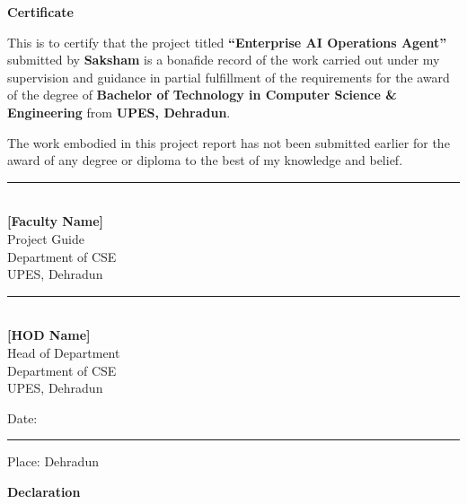 \documentclass[12pt, a4paper]{report}
\begin{document}
\newpage
\thispagestyle{empty}
\begin{center}
{\LARGE \textbf{Certificate}}
\end{center}

\vspace{1cm}

This is to certify that the project titled \textbf{``Enterprise AI Operations Agent''} submitted by \textbf{Saksham} is a bonafide record of the work carried out under my supervision and guidance in partial fulfillment of the requirements for the award of the degree of \textbf{Bachelor of Technology in Computer Science \& Engineering} from \textbf{UPES, Dehradun}.

The work embodied in this project report has not been submitted earlier for the award of any degree or diploma to the best of my knowledge and belief.

\vspace{3cm}

\begin{minipage}{0.45\textwidth}
\begin{center}
\rule{5cm}{0.4pt}\\
\textbf{[Faculty Name]}\\
Project Guide\\
Department of CSE\\
UPES, Dehradun
\end{center}
\end{minipage}
\hfill
\begin{minipage}{0.45\textwidth}
\begin{center}
\rule{5cm}{0.4pt}\\
\textbf{[HOD Name]}\\
Head of Department\\
Department of CSE\\
UPES, Dehradun
\end{center}
\end{minipage}

\vspace{2cm}

\begin{center}
Date: \rule{3cm}{0.4pt} \hspace{2cm} Place: Dehradun
\end{center}

\newpage
\thispagestyle{empty}
\begin{center}
{\LARGE \textbf{Declaration}}
\end{center}
\end{document}
